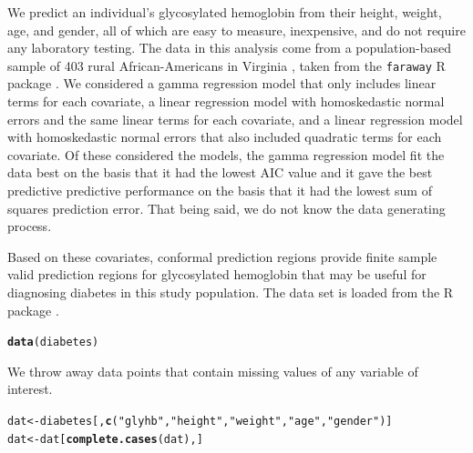 \documentclass[11pt]{article}\usepackage[]{graphicx}\usepackage[]{color}
\makeatletter
\newcommand{\hlstr}[1]{\textcolor[rgb]{0.192,0.494,0.8}{#1}}%
\newcommand{\hlstd}[1]{\textcolor[rgb]{0.345,0.345,0.345}{#1}}%
\newcommand{\hlkwb}[1]{\textcolor[rgb]{0.69,0.353,0.396}{#1}}%
\newcommand{\hlkwd}[1]{\textcolor[rgb]{0.737,0.353,0.396}{\textbf{#1}}}%
\newenvironment{kframe}{%
 \def\at@end@of@kframe{}%
 \ifinner\ifhmode%
  \def\at@end@of@kframe{\end{minipage}}%
  \begin{minipage}{\columnwidth}%
 \fi\fi%
 \def\FrameCommand##1{\hskip\@totalleftmargin \hskip-\fboxsep
 \colorbox{shadecolor}{##1}\hskip-\fboxsep
     \hskip-\linewidth \hskip-\@totalleftmargin \hskip\columnwidth}%
 \MakeFramed {\advance\hsize-\width
   \@totalleftmargin\z@ \linewidth\hsize
   \@setminipage}}%
 {\par\unskip\endMakeFramed%
 \at@end@of@kframe}
\newenvironment{knitrout}{}{} %
\makeatother
\begin{document}
We predict an individual's glycosylated hemoglobin from their height, 
weight, age, and gender, all of which are easy to measure, inexpensive, and do 
not require any laboratory testing.  
The data in this analysis come from a population-based sample of 403 rural 
African-Americans in Virginia \citep{willems1997prevalence}, taken from the 
\texttt{faraway} R package \citep{faraway2016R}.  
We considered a gamma regression model that only includes linear terms for 
each covariate, a linear regression model with homoskedastic normal errors 
and the same linear terms for each covariate, and a linear regression model 
with homoskedastic normal errors that also included quadratic terms for 
each covariate.
Of these considered the models, the gamma regression model fit the data 
best on the basis that it had the lowest AIC value and it gave the best 
predictive predictive performance on the basis that it had the lowest 
sum of squares prediction error.  
That being said, we do not know the data generating process.

Based on these covariates, conformal prediction regions provide finite sample 
valid prediction regions for glycosylated hemoglobin that may be useful for 
diagnosing diabetes in this study population.
The data set is loaded from the R package \citet{faraway2016R}.

\begin{knitrout}
\color{fgcolor}\begin{kframe}
\begin{alltt}
\hlkwd{data}\hlstd{(diabetes)}
\end{alltt}
\end{kframe}
\end{knitrout}

We throw away data points that contain missing values of any variable of 
interest.

\begin{knitrout}
\color{fgcolor}\begin{kframe}
\begin{alltt}
\hlstd{dat} \hlkwb{<-} \hlstd{diabetes[,} \hlkwd{c}\hlstd{(}\hlstr{"glyhb"}\hlstd{,} \hlstr{"height"}\hlstd{,} \hlstr{"weight"}\hlstd{,} \hlstr{"age"}\hlstd{,} \hlstr{"gender"}\hlstd{)]}
\hlstd{dat} \hlkwb{<-} \hlstd{dat[}\hlkwd{complete.cases}\hlstd{(dat), ]}
\end{alltt}
\end{kframe}
\end{knitrout}
\end{document}
